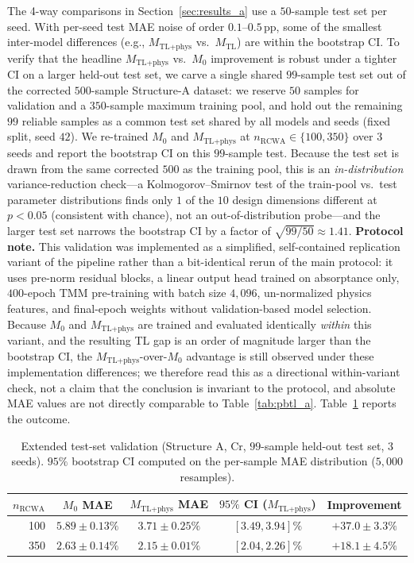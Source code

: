 \documentclass[a4paper,fleqn]{cas-sc}
\newcommand{\Mzero}{M_0}
\newcommand{\Mtl}{M_\text{TL}}
\newcommand{\Mtlphys}{M_\text{TL+phys}}
\begin{document}
The 4-way comparisons in Section~\ref{sec:results_a} use a $50$-sample test set per seed. With per-seed test MAE noise of order $0.1$--$0.5$\,pp, some of the smallest inter-model differences (e.g., $\Mtlphys$ vs.\ $\Mtl$) are within the bootstrap CI. To verify that the headline $\Mtlphys$ vs.\ $\Mzero$ improvement is robust under a tighter CI on a larger held-out test set, we carve a single shared $99$-sample test set out of the corrected $500$-sample Structure-A dataset: we reserve $50$ samples for validation and a $350$-sample maximum training pool, and hold out the remaining $99$ reliable samples as a common test set shared by all models and seeds (fixed split, seed $42$). We re-trained $\Mzero$ and $\Mtlphys$ at $n_\text{RCWA} \in \{100, 350\}$ over $3$ seeds and report the bootstrap CI on this $99$-sample test. Because the test set is drawn from the same corrected $500$ as the training pool, this is an \emph{in-distribution} variance-reduction check---a Kolmogorov--Smirnov test of the train-pool vs.\ test parameter distributions finds only $1$ of the $10$ design dimensions different at $p<0.05$ (consistent with chance), not an out-of-distribution probe---and the larger test set narrows the bootstrap CI by a factor of $\sqrt{99/50}\approx 1.41$. \textbf{Protocol note.} This validation was implemented as a simplified, self-contained replication variant of the pipeline rather than a bit-identical rerun of the main protocol: it uses pre-norm residual blocks, a linear output head trained on absorptance only, $400$-epoch TMM pre-training with batch size $4{,}096$, un-normalized physics features, and final-epoch weights without validation-based model selection. Because $\Mzero$ and $\Mtlphys$ are trained and evaluated identically \emph{within} this variant, and the resulting TL gap is an order of magnitude larger than the bootstrap CI, the $\Mtlphys$-over-$\Mzero$ advantage is still observed under these implementation differences; we therefore read this as a directional within-variant check, not a claim that the conclusion is invariant to the protocol, and absolute MAE values are not directly comparable to Table~\ref{tab:pbtl_a}. Table~\ref{tab:expanded_test} reports the outcome.

\begin{table}[htbp]\centering\small
\caption{Extended test-set validation (Structure A, Cr, $99$-sample held-out test set, $3$ seeds). $95\%$ bootstrap CI computed on the per-sample MAE distribution ($5{,}000$ resamples).}
\label{tab:expanded_test}
\begin{tabular}{r ccc c}\toprule
$n_\text{RCWA}$ & $\Mzero$ MAE & $\Mtlphys$ MAE & \textbf{$95\%$ CI} ($\Mtlphys$) & \textbf{Improvement}\\\midrule
100 & $5.89 \pm 0.13\%$ & $3.71 \pm 0.25\%$ & $[3.49, 3.94]\%$ & $+37.0 \pm 3.3\%$\\
350 & $2.63 \pm 0.14\%$ & $2.15 \pm 0.01\%$ & $[2.04, 2.26]\%$ & $+18.1 \pm 4.5\%$\\\bottomrule
\end{tabular}
\end{table}
\end{document}
